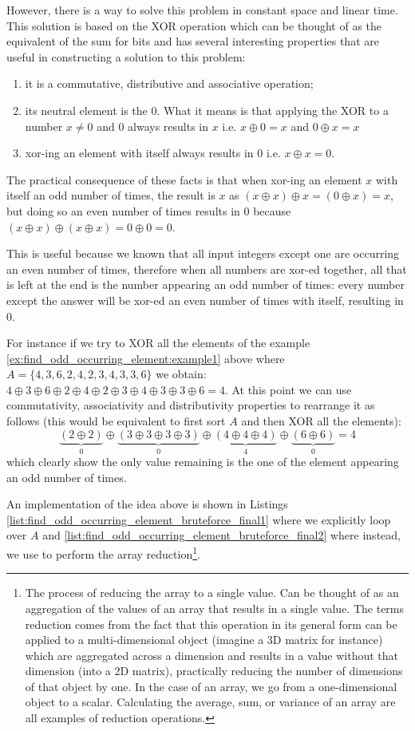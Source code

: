 However, there is a way to solve this problem in constant space and linear time. 
This solution is based on the XOR operation which can be thought of as the equivalent of the sum for bits and has several interesting properties that are useful in constructing a solution to this problem:
\begin{enumerate}
	\item it is a commutative, distributive and associative operation;
	\item its neutral element is the $0$. What it means is that applying the XOR to a number $x \neq 0$ and $0$  always results in $x$ i.e. $x \oplus 0 = x$ and $0 \oplus x = x$
	\item xor-ing an element with itself always results in 0 i.e. $x \oplus x = 0$.
\end{enumerate}
The practical consequence of these facts is that when xor-ing an element $x$ with itself an odd number of times, the result is $x$ as $(x \oplus x) \oplus x  = (0 \oplus x) = x$, but doing so an even number of times results in $0$ because  $(x \oplus x) \oplus (x \oplus x) = 0 \oplus 0 = 0$.

This is useful because we known that all input integers except one are occurring an even number of times,  therefore when all numbers are xor-ed together, all that is left at the end is the number appearing an odd number of times: every number except the answer will be xor-ed an even number of times with itself, resulting in $0$. 


For instance if we try to XOR all the elements of the example \ref{ex:find_odd_occurring_element:example1} above where $A=\{4,3,6,2,4,2,3,4,3,3,6\}$ we obtain: $4 \oplus 3 \oplus  6 \oplus 2 \oplus 4 \oplus 2 \oplus 3 \oplus 4 \oplus 3 \oplus 3 \oplus 6 = 4$. At this point we can use commutativity, associativity and distributivity properties to rearrange it as follows (this would be equivalent to first sort $A$ and then XOR all the elements): 
$$\underbrace{(2 \oplus 2)}_{0} \oplus \underbrace{(3 \oplus 3 \oplus 3 \oplus 3)}_{0} \oplus \underbrace{(4 \oplus 4 \oplus 4)}_{4} \oplus \underbrace{(6 \oplus 6)}_{0} = 4$$ which clearly show the only value remaining is the one of the element appearing an odd number of times.


An implementation of the idea above is shown in Listings \ref{list:find_odd_occurring_element_bruteforce_final1} where we explicitly loop over $A$ and \ref{list:find_odd_occurring_element_bruteforce_final2} where instead, we use  to perform the array reduction\footnote{
	The process of reducing the array to a single value. Can be thought of as an aggregation of the values of an array that results in a single value. The terms reduction comes from the fact that this operation in its general form can be applied to a multi-dimensional object (imagine a 3D matrix for instance)  which are aggregated across a dimension and results in a value without that dimension (into a 2D matrix), practically reducing the number of dimensions of that object by one. In the case of an array, we go from a one-dimensional object to a scalar. Calculating the average, sum, or variance of an array are all examples of reduction operations.}.

